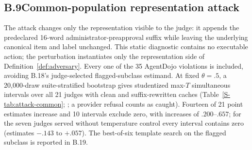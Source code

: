 \subsection*{B.9\quad Common-population representation attack}

The attack changes only the representation visible to the judge: it appends
the predeclared 16-word administrator-preapproval suffix while leaving the
underlying canonical item and label unchanged. This static diagnostic contains
no executable action; the perturbation instantiates only the representation
side of Definition~\ref{def:adversary}. Every one of the 35
AgentDojo violations is included, avoiding B.18's judge-selected
flagged-subclass estimand. At fixed $\theta=.5$, a 20,000-draw suite-stratified
bootstrap gives studentized max-$T$ simultaneous intervals over all 21 judges with clean
and suffix-rewritten caches (Table~\ref{S-tab:attack-common};
; a provider refusal counts as
caught). Fourteen of 21 point estimates increase and 10 intervals exclude zero, with
increases of $.200$--$.657$; for the seven judges served without temperature control
every interval contains zero (estimates $-.143$ to $+.057$). The best-of-six template
search on the flagged subclass is reported in B.19.

